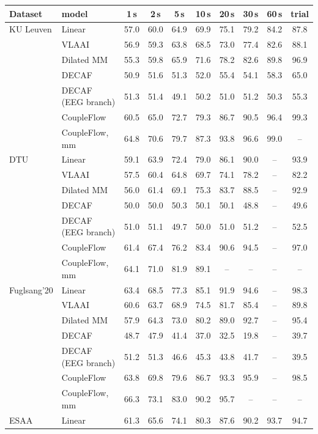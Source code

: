 \begin{tabular}{llcccccccc}\toprule
Dataset & model & 1\,s & 2\,s & 5\,s & 10\,s & 20\,s & 30\,s & 60\,s & trial \\\midrule
KU Leuven & Linear & 57.0 & 60.0 & 64.9 & 69.9 & 75.1 & 79.2 & 84.2 & 87.8 \\
 & VLAAI & 56.9 & 59.3 & 63.8 & 68.5 & 73.0 & 77.4 & 82.6 & 88.1 \\
 & Dilated MM & 55.3 & 59.8 & 65.9 & 71.6 & 78.2 & 82.6 & 89.8 & 96.9 \\
 & DECAF & 50.9 & 51.6 & 51.3 & 52.0 & 55.4 & 54.1 & 58.3 & 65.0 \\
 & DECAF (EEG branch) & 51.3 & 51.4 & 49.1 & 50.2 & 51.0 & 51.2 & 50.3 & 55.3 \\
 & CoupleFlow & 60.5 & 65.0 & 72.7 & 79.3 & 86.7 & 90.5 & 96.4 & 99.3 \\
 & CoupleFlow, mm & 64.8 & 70.6 & 79.7 & 87.3 & 93.8 & 96.6 & 99.0 & -- \\
\midrule
DTU & Linear & 59.1 & 63.9 & 72.4 & 79.0 & 86.1 & 90.0 & -- & 93.9 \\
 & VLAAI & 57.5 & 60.4 & 64.8 & 69.7 & 74.1 & 78.2 & -- & 82.2 \\
 & Dilated MM & 56.0 & 61.4 & 69.1 & 75.3 & 83.7 & 88.5 & -- & 92.9 \\
 & DECAF & 50.0 & 50.0 & 50.3 & 50.1 & 50.1 & 48.8 & -- & 49.6 \\
 & DECAF (EEG branch) & 51.0 & 51.1 & 49.7 & 50.0 & 51.0 & 51.2 & -- & 52.5 \\
 & CoupleFlow & 61.4 & 67.4 & 76.2 & 83.4 & 90.6 & 94.5 & -- & 97.0 \\
 & CoupleFlow, mm & 64.1 & 71.0 & 81.9 & 89.1 & -- & -- & -- & -- \\
\midrule
Fuglsang'20 & Linear & 63.4 & 68.5 & 77.3 & 85.1 & 91.9 & 94.6 & -- & 98.3 \\
 & VLAAI & 60.6 & 63.7 & 68.9 & 74.5 & 81.7 & 85.4 & -- & 89.8 \\
 & Dilated MM & 57.9 & 64.3 & 73.0 & 80.2 & 89.0 & 92.7 & -- & 95.4 \\
 & DECAF & 48.7 & 47.9 & 41.4 & 37.0 & 32.5 & 19.8 & -- & 39.7 \\
 & DECAF (EEG branch) & 51.2 & 51.3 & 46.6 & 45.3 & 43.8 & 41.7 & -- & 39.5 \\
 & CoupleFlow & 63.8 & 69.8 & 79.6 & 86.7 & 93.3 & 95.9 & -- & 98.5 \\
 & CoupleFlow, mm & 66.3 & 73.1 & 83.0 & 90.2 & 95.7 & -- & -- & -- \\
\midrule
ESAA & Linear & 61.3 & 65.6 & 74.1 & 80.3 & 87.6 & 90.2 & 93.7 & 94.7 \\

\end{tabular}
